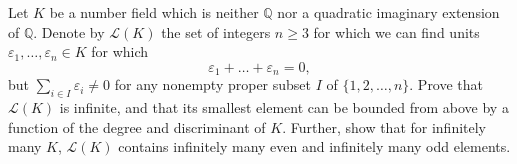 Let $K$ be a number field which is neither $\mathbb{Q}$ nor a quadratic imaginary extension of $\mathbb{Q}$. Denote by $\mathcal{L}(K)$ the set of integers $n\ge 3$ for which we can find units $\varepsilon_1,\ldots,\varepsilon_n\in K$ for which
$$\varepsilon_1+\dots+\varepsilon_n=0,$$but $\displaystyle\sum_{i\in I}\varepsilon_i\neq 0$ for any nonempty proper subset $I$ of $\{1,2,\dots,n\}$. Prove that $\mathcal{L}(K)$ is infinite, and that its smallest element can be bounded from above by a function of the degree and discriminant of $K$. Further, show that for infinitely many $K$, $\mathcal{L}(K)$ contains infinitely many even and infinitely many odd elements.